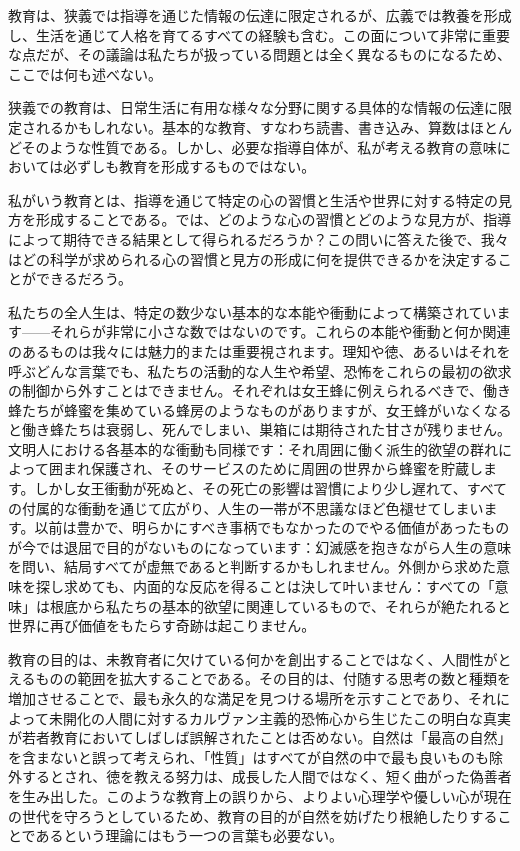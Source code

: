 \documentclass[a4paper,11pt,openany]{ltjsbook}
\begin{document}
教育は、狭義では指導を通じた情報の伝達に限定されるが、広義では教養を形成し、生活を通じて人格を育てるすべての経験も含む。この面について非常に重要な点だが、その議論は私たちが扱っている問題とは全く異なるものになるため、ここでは何も述べない。

狭義での教育は、日常生活に有用な様々な分野に関する具体的な情報の伝達に限定されるかもしれない。基本的な教育、すなわち読書、書き込み、算数はほとんどそのような性質である。しかし、必要な指導自体が、私が考える教育の意味においては必ずしも教育を形成するものではない。

私がいう教育とは、指導を通じて特定の心の習慣と生活や世界に対する特定の見方を形成することである。では、どのような心の習慣とどのような見方が、指導によって期待できる結果として得られるだろうか？この問いに答えた後で、我々はどの科学が求められる心の習慣と見方の形成に何を提供できるかを決定することができるだろう。

私たちの全人生は、特定の数少ない基本的な本能や衝動によって構築されています——それらが非常に小さな数ではないのです。これらの本能や衝動と何か関連のあるものは我々には魅力的または重要視されます。理知や徳、あるいはそれを呼ぶどんな言葉でも、私たちの活動的な人生や希望、恐怖をこれらの最初の欲求の制御から外すことはできません。それぞれは女王蜂に例えられるべきで、働き蜂たちが蜂蜜を集めている蜂房のようなものがありますが、女王蜂がいなくなると働き蜂たちは衰弱し、死んでしまい、巣箱には期待された甘さが残りません。文明人における各基本的な衝動も同様です：それ周囲に働く派生的欲望の群れによって囲まれ保護され、そのサービスのために周囲の世界から蜂蜜を貯蔵します。しかし女王衝動が死ぬと、その死亡の影響は習慣により少し遅れて、すべての付属的な衝動を通じて広がり、人生の一帯が不思議なほど色褪せてしまいます。以前は豊かで、明らかにすべき事柄でもなかったのでやる価値があったものが今では退屈で目的がないものになっています：幻滅感を抱きながら人生の意味を問い、結局すべてが虚無であると判断するかもしれません。外側から求めた意味を探し求めても、内面的な反応を得ることは決して叶いません：すべての「意味」は根底から私たちの基本的欲望に関連しているもので、それらが絶たれると世界に再び価値をもたらす奇跡は起こりません。

教育の目的は、未教育者に欠けている何かを創出することではなく、人間性がとえるものの範囲を拡大することである。その目的は、付随する思考の数と種類を増加させることで、最も永久的な満足を見つける場所を示すことであり、それによって未開化の人間に対するカルヴァン主義的恐怖心から生じたこの明白な真実が若者教育においてしばしば誤解されたことは否めない。自然は「最高の自然」を含まないと誤って考えられ、「性質」はすべてが自然の中で最も良いものも除外するとされ、徳を教える努力は、成長した人間ではなく、短く曲がった偽善者を生み出した。このような教育上の誤りから、よりよい心理学や優しい心が現在の世代を守ろうとしているため、教育の目的が自然を妨げたり根絶したりすることであるという理論にはもう一つの言葉も必要ない。
\end{document}
